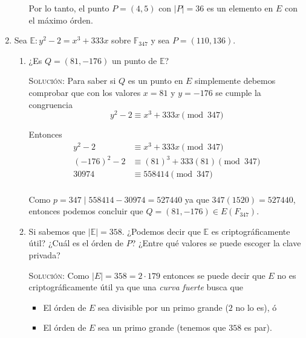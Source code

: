 \documentclass[letterpaper,11pt]{article}
\begin{document}
\begin{enumerate}
\begin{enumerate}
        Por lo tanto, el punto $P = (4, 5)$ con $|P| = 36$ es un
        elemento en $E$ con el máximo órden.
    \end{enumerate}

    \newpage
    \item Sea $\mathbb{E} : y^2 - 2 = x^3 + 333x$ sobre $\mathbb{F}_{347}$ y 
    sea $P = (110, 136)$. 
    \begin{enumerate}
        \item ¿Es $Q = (81, -176)$ un punto de $\mathbb{E}$?
        
        \textsc{Solución:} Para saber si $Q$ es un punto en $E$ simplemente 
        debemos comprobar que con los valores $x = 81$ y $y = -176$ se cumple
        la congruencia 
        \begin{equation*}
            y^2 - 2 \equiv x^3 + 333x \pmod{347}
        \end{equation*}
        
        Entonces
        \begin{align*}
            y^2 - 2 &\equiv x^3 + 333x \pmod{347} \\
            (-176)^2 - 2 &\equiv (81)^3 + 333(81) \pmod{347} \\
            30 974 &\equiv 558 414 \pmod{347} \\ 
        \end{align*}
        
        Como $p = 347 \; | \; 558414 - 30974 = 527 440$ ya que 
        $347(1520) = 527 440$, entonces podemos concluir que 
        $Q = (81, -176) \in E(F_{347})$.

        \item Si sabemos que $|\mathbb{E}| = 358$. ¿Podemos decir que 
        $\mathbb{E}$ es criptográficamente útil? ¿Cuál es el órden de $P$? 
        ¿Entre qué valores se puede escoger la clave privada?

        \textsc{Solución:} Como $|E| = 358 = 2 \cdot 179$ entonces se puede
        decir que $E$ no es criptográficamente útil ya que una 
        \textit{curva fuerte} busca que 
        \begin{itemize}
            \item El órden de $E$ sea divisible por un primo grande ($2$ no lo 
            es), ó 
            \item El órden de $E$ sea un primo grande (tenemos que $358$ es par).
        \end{itemize}
      

\end{enumerate}
\end{enumerate}
\end{document}
